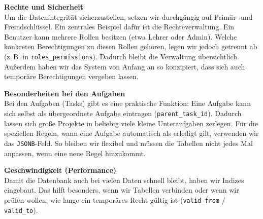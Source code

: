 \vspace{0.5cm}
\noindent\textbf{Rechte und Sicherheit} \\
Um die Datenintegrität sicherzustellen, setzen wir durchgängig auf Primär- und Fremdschlüssel. Ein zentrales Beispiel dafür ist die Rechteverwaltung. Ein Benutzer kann mehrere Rollen besitzen (etwa Lehrer oder Admin). Welche konkreten Berechtigungen zu diesen Rollen gehören, legen wir jedoch getrennt ab (z.\,B. in \texttt{roles\_permissions}). Dadurch bleibt die Verwaltung übersichtlich. Außerdem haben wir das System von Anfang an so konzipiert, dass sich auch temporäre Berechtigungen vergeben lassen.

\vspace{0.5cm}
\noindent\textbf{Besonderheiten bei den Aufgaben} \\
Bei den Aufgaben (Tasks) gibt es eine praktische Funktion: Eine Aufgabe kann sich selbst als übergeordnete Aufgabe eintragen (\texttt{parent\_task\_id}). Dadurch lassen sich große Projekte in beliebig viele kleine Unteraufgaben zerlegen\cite{celko2004trees}. Für die speziellen Regeln, wann eine Aufgabe automatisch als erledigt gilt, verwenden wir das \texttt{JSONB}-Feld\cite{postgresql_jsonb}. So bleiben wir flexibel und müssen die Tabellen nicht jedes Mal anpassen, wenn eine neue Regel hinzukommt.

\vspace{0.5cm}
\noindent\textbf{Geschwindigkeit (Performance)} \\
Damit die Datenbank auch bei vielen Daten schnell bleibt, haben wir Indizes eingebaut. Das hilft besonders, wenn wir Tabellen verbinden oder wenn wir prüfen wollen, wie lange ein temporäres Recht gültig ist (\texttt{valid\_from} / \texttt{valid\_to})\cite{elmasri2015fundamentals}.

\label{sec:api_design_sicherheit}

